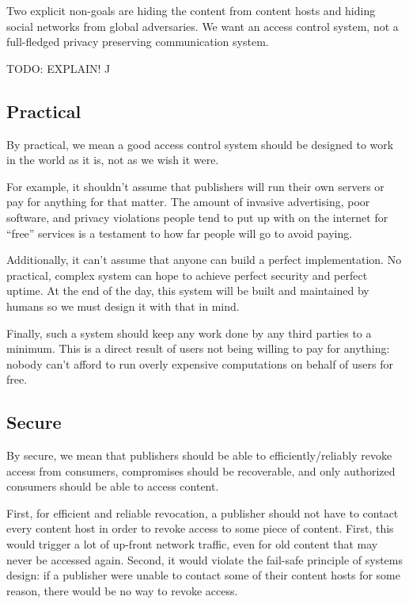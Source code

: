\documentclass[pdftex,12pt,a4papaer]{report}
\begin{document}
Two explicit non-goals are hiding the content from content hosts and hiding
social networks from global adversaries. We want an access control system, not a
full-fledged privacy preserving communication system.

TODO: EXPLAIN! ^^


\subsection{Practical}

By practical, we mean a good access control system should be designed to work in
the world as it is, not as we wish it were.

For example, it shouldn't assume that publishers will run their own servers or
pay for anything for that matter. The amount of invasive advertising, poor
software, and privacy violations people tend to put up with on the internet for
``free'' services is a testament to how far people will go to avoid paying.

Additionally, it can't assume that anyone can build a perfect implementation. No
practical, complex system can hope to achieve perfect security and perfect
uptime. At the end of the day, this system will be built and maintained by
humans so we must design it with that in mind.

Finally, such a system should keep any work done by any third parties to a
minimum. This is a direct result of users not being willing to pay for anything:
nobody can't afford to run overly expensive computations on behalf of users for
free.

\subsection{Secure}

By secure, we mean that publishers should be able to efficiently/reliably revoke
access from consumers, compromises should be recoverable, and only authorized
consumers should be able to access content.

First, for efficient and reliable revocation, a publisher should not have to
contact every content host in order to revoke access to some piece of content.
First, this would trigger a lot of up-front network traffic, even for old
content that may never be accessed again. Second, it would violate the fail-safe
principle of systems design: if a publisher were unable to contact some of their
content hosts for some reason, there would be no way to revoke access.
\end{document}
